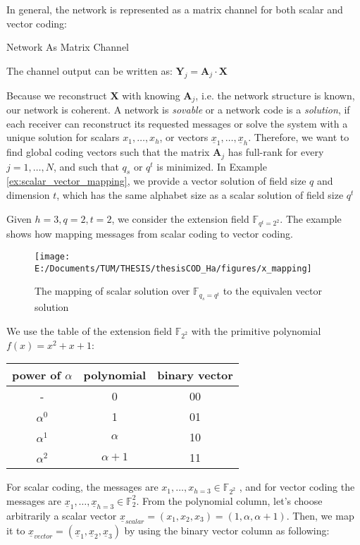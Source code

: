 In general, the network is represented as a matrix channel for both
scalar and vector coding:
\begin{defn}
Network As Matrix Channel

The channel output can be written as: $\boldsymbol{Y}_{j}=\boldsymbol{A}_{j}\cdot\boldsymbol{X}$
\end{defn}
Because we reconstruct $\boldsymbol{X}$ with knowing $\boldsymbol{A}_{j}$,
i.e. the network structure is known, our network is coherent. A network
is \textit{sovable} or a network code is a \textit{solution}, if each
receiver can reconstruct its requested messages or solve the system
with a unique solution for scalars $x_{1},\ldots,x_{h}$, or vectors
$\underline{x}_{1},\ldots,\underline{x}_{h}$. Therefore, we want
to find global coding vectors such that the matrix $\boldsymbol{A}_{j}$
has full-rank for every $j=1,\ldots,N$, and such that $q_{s}$ or
$q^{t}$ is minimized. In Example \ref{ex:scalar_vector_mapping},
we provide a vector solution of field size $q$ and dimension $t$,
which has the same alphabet size as a scalar solution of field size
$q^{t}$
\begin{example}
\label{ex:scalar_vector_mapping} 

Given $h=3,q=2,t=2$, we consider the extension field $\ensuremath{\mathbb{F}}_{q^{t}=2^{2}}$.
The example shows how mapping messages from scalar coding to vector
coding.
\end{example}
\begin{figure}[H]
\caption{The mapping of scalar solution over $\ensuremath{\mathbb{F}}_{q_{s}=q^{t}}$
to the equivalen vector solution\label{fig:x_mapping}}

\texttt{[image: E:/Documents/TUM/THESIS/thesisCOD\_Ha/figures/x\_mapping]}
\end{figure}

\begin{example}
We use the table of the extension field $\ensuremath{\mathbb{F}}_{2^{2}}$
with the primitive polynomial $f(x)=x^{2}+x+1$:
\end{example}
\begin{tabular}{|c|c|c|}
\hline 
power of $\alpha$ & polynomial & binary vector\tabularnewline
\hline 
- & 0 & 00\tabularnewline
\hline 
$\alpha^{0}$ & 1 & 01\tabularnewline
\hline 
$\alpha^{1}$ & $\alpha$ & 10\tabularnewline
\hline 
$\alpha^{2}$ & $\alpha+1$ & 11\tabularnewline
\hline 
\end{tabular}

For scalar coding, the messages are $x_{1},\ldots,x_{h=3}\in\ensuremath{\mathbb{F}}_{2^{2}}$
, and for vector coding the messages are $\underline{x}_{1},\ldots,\underline{x}_{h=3}\in\ensuremath{\mathbb{F}}_{2}^{2}$.
From the polynomial column, let's choose arbitrarily a scalar vector
$\underline{x}_{scalar}=(x_{1},x_{2},x_{3})=(1,\alpha,\alpha+1)$.
Then, we map it to $\underline{x}_{vector}=(\underline{x}_{1},\underline{x}_{2},\underline{x}_{3})$
by using the binary vector column as following:

